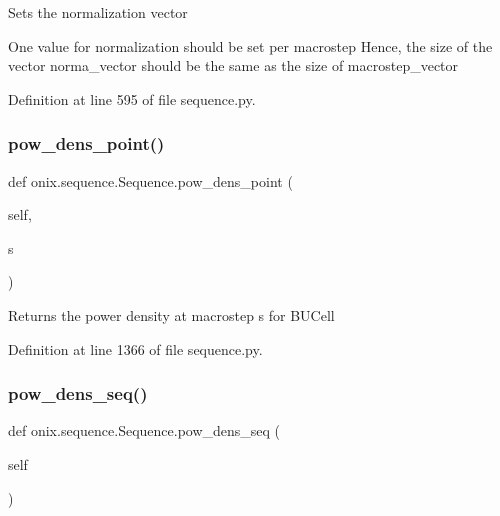 \begin{DoxyVerb}Sets the normalization vector

One value for normalization should be set per macrostep
Hence, the size of the vector norma_vector should be the same
as the size of macrostep_vector
\end{DoxyVerb}
 

Definition at line 595 of file sequence.\+py.

\mbox{\label{classonix_1_1sequence_1_1Sequence_add32b009bcb9686326857ba0b775a455}} 
\subsubsection{\texorpdfstring{pow\+\_\+dens\+\_\+point()}{pow\_dens\_point()}}
{\footnotesize\ttfamily def onix.\+sequence.\+Sequence.\+pow\+\_\+dens\+\_\+point (\begin{DoxyParamCaption}\item[{}]{self,  }\item[{}]{s }\end{DoxyParamCaption})}

\begin{DoxyVerb}Returns the power density at macrostep s for BUCell\end{DoxyVerb}
 

Definition at line 1366 of file sequence.\+py.

\mbox{\label{classonix_1_1sequence_1_1Sequence_a230e31e518e64a65e3ea13a677dd2ca0}} 
\subsubsection{\texorpdfstring{pow\+\_\+dens\+\_\+seq()}{pow\_dens\_seq()}\hspace{0.1cm}{\footnotesize\ttfamily [1/2]}}
{\footnotesize\ttfamily def onix.\+sequence.\+Sequence.\+pow\+\_\+dens\+\_\+seq (\begin{DoxyParamCaption}\item[{}]{self }\end{DoxyParamCaption})}

